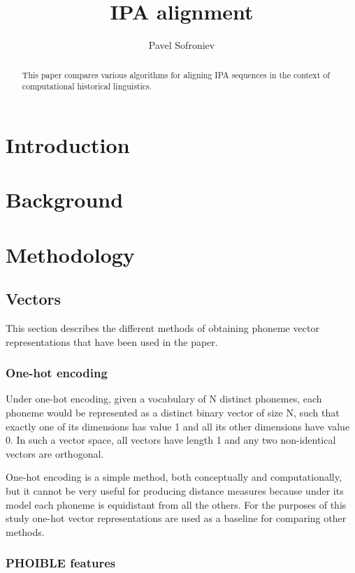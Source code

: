 \documentclass[a4paper]{report}
\begin{document}
\title{IPA alignment}
\author{Pavel Sofroniev}
\maketitle

\begin{abstract}
	This paper compares various algorithms for aligning IPA sequences in the context of computational historical linguistics.
\end{abstract}


\chapter{Introduction}


\chapter{Background}


\chapter{Methodology}

\section{Vectors}

This section describes the different methods of obtaining phoneme vector representations that have been used in the paper.

\subsection{One-hot encoding}

Under one-hot encoding, given a vocabulary of N distinct phonemes, each phoneme would be represented as a distinct binary vector of size N,
such that exactly one of its dimensions has value 1 and all its other dimensions have value 0.
In such a vector space, all vectors have length 1 and any two non-identical vectors are orthogonal.

One-hot encoding is a simple method, both conceptually and computationally, but it cannot be very useful for producing distance measures
because under its model each phoneme is equidistant from all the others.
For the purposes of this study one-hot vector representations are used as a baseline for comparing other methods.


\subsection{PHOIBLE features}
\end{document}
